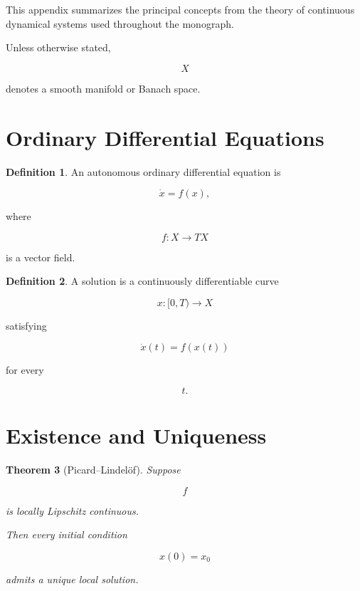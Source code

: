 \documentclass[11pt]{book}
\numberwithin{equation}{chapter}
\theoremstyle{definition}
\newtheorem{definition}{Definition}[chapter]
\theoremstyle{plain}
\newtheorem{theorem}[definition]{Theorem}
\begin{document}
This appendix summarizes the principal concepts from the theory of
continuous dynamical systems used throughout the monograph.

Unless otherwise stated,

\[
X
\]

denotes a smooth manifold or Banach space.


\section{Ordinary Differential Equations}

\begin{definition}

An autonomous ordinary differential equation is

\[
\dot{x}
=
f(x),
\]

where

\[
f:X\rightarrow TX
\]

is a vector field.

\end{definition}


\begin{definition}

A solution is a continuously differentiable curve

\[
x:[0,T)\rightarrow X
\]

satisfying

\[
\dot{x}(t)=f(x(t))
\]

for every

\[
t.
\]

\end{definition}


\section{Existence and Uniqueness}

\begin{theorem}[Picard--Lindelöf]

Suppose

\[
f
\]

is locally Lipschitz continuous.

Then every initial condition

\[
x(0)=x_0
\]

admits a unique local solution.

\end{theorem}
\end{document}
